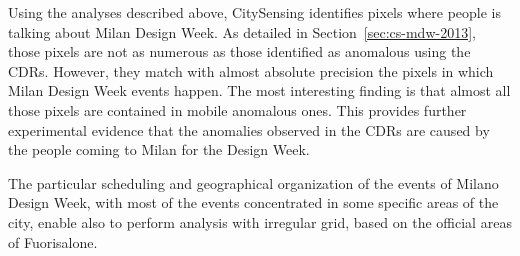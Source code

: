 Using the analyses described above, CitySensing identifies pixels where people is talking about Milan Design Week. As detailed in Section~\ref{sec:cs-mdw-2013}, those pixels are not as numerous as those identified as anomalous using the CDRs. However, they match with almost absolute precision the pixels in which Milan Design Week events happen. The most interesting finding is that almost all those pixels are contained in mobile anomalous ones. This provides further experimental evidence that the anomalies observed in the CDRs are caused by the people coming to Milan for the Design Week.

The particular scheduling and geographical organization of the events of Milano Design Week, with most of the events concentrated in some specific areas of the city, enable also to perform analysis with irregular \textsf{grid}, based on the official areas of Fuorisalone.



